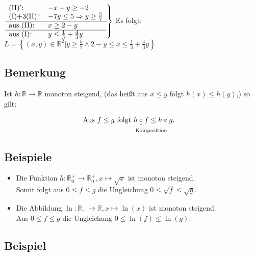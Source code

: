      
	$\left.  \begin{array}{ll}
             
                \textnormal{(II)':}			& -x-y\geq -2								\\
                \textnormal{(I)+3(II)':}	& -7y \leq 5 \Rightarrow y \geq \frac{5}{7} \\ \hline
                \textnormal{aus (II):}		& x \geq 2-y								\\ \hline
     			\textnormal{aus (I):}		& y\leq \frac{1}{3}+\frac{4}{3}y                
                
              \end{array} 	  \right\}$ Es folgt: $L=\left\{ \left( x,y \right) \in \mathbb{R}^2 
              | y\geq \frac{5}{7} \land 2-y \leq x \leq \frac{1}{3}+\frac{4}{3}y \right\}$
              
              
\subsection{Bemerkung}

	Ist $h: \mathbb{R} \rightarrow \mathbb{R}$ monoton steigend, (das heißt aus $x\leq y$ folgt $h(x)\leq h(y)$,)
	so gilt:
	
	\begin{align*}
	\textnormal{Aus } f \leq g \textnormal{ folgt } h &\circexpl{Komposition} f \leq h \circ g.
	\end{align*}	
	
	
\subsection{Beispiele}

	\begin{itemize}
	\item Die Funktion $h: \mathbb{R}_0^+ \rightarrow \mathbb{R}_0^+, x\mapsto\sqrt{x}$ ist monoton steigend.\\
	Somit folgt aus $0 \leq f \leq g$ die Ungleichung $0 \leq \sqrt{f} \leq \sqrt{g}$.
	
	\item Die Abbildung $\ln: \mathbb{R}_+ \rightarrow \mathbb{R}, x\mapsto\ln(x)$ ist monoton steigend.\\
	Aus $0 \leq f \leq g$ die Ungleichung $0 \leq \ln(f) \leq \ln(g)$.
	\end{itemize}
	
	
\subsection{Beispiel}

